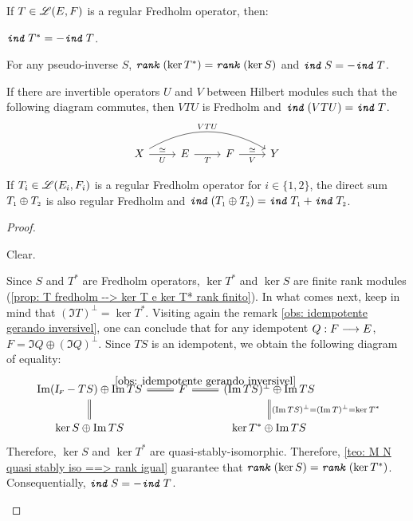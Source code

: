 \begin{proposicao}
\label{prop: propriedades de fredholm}
If $T\in \mathscr L(E,F)$ is a regular Fredholm operator, then:
\begin{itroman}
\item $\texttt{\textit{ind}}\, T^* = -\texttt{\textit{ind}}\, T$.
\item \label{prop item: propriedades de fredholm} For any pseudo-inverse $S$, $\texttt{\textit{rank}}\,(\ker T^*) = \texttt{\textit{rank}}\,(\ker S)$ and $\texttt{\textit{ind}}\, S = - \texttt{\textit{ind}}\, T$.
\item \label{prop item: invertivel tem ind = 0} If there are invertible operators $U$ and $V$ between Hilbert modules such that the following diagram commutes, then $VTU$ is Fredholm and $\texttt{\textit{ind}}\,(VTU) = \texttt{\textit{ind}}\, T$.
\begin{equation*}
\begin{tikzcd}
X \arrow[r, "U"', "\simeq"] \arrow[rrr, "VTU", bend left] & E \arrow[r, "T"'] & F \arrow[r, "V"', "\simeq"] & Y
\end{tikzcd}
\end{equation*}
\item \label{prop item: ind(T (+) F) = ind T + ind F} If $T_i\in \mathscr L(E_i,F_i)$ is a regular Fredholm operator for $i\in \{1,2\}$, the direct sum $\sub{T}{1}\oplus \sub{T}{2}$ is also regular Fredholm and $\ind(\sub{T}{1}\oplus \sub{T}{2}) = \ind \sub{T}{1}  + \ind \sub{T}{2}$.
\end{itroman}
\begin{proof}$\left.\right.$
\begin{itroman}
\item Clear.
\item Since $S$ and $T^*$ are Fredholm operators, $\ker T^*$ and $\ker S$ are finite rank modules (\ref{prop: T fredholm --> ker T e ker T* rank finito}). In what comes next, keep in mind that $(\Im T)^{\perp} = \ker T^*$. Visiting again the remark \ref{obs: idempotente gerando inversivel}, one can conclude that for any idempotent $Q : F \longrightarrow E$, $F = \Im Q \oplus (\Im Q)^{\perp}$. Since $TS$ is an idempotent, we obtain the following diagram of equality:
\begin{equation*}
\begin{tikzcd}
\Im(\sub\Id F-TS)\oplus \Im TS \arrow[d, equal] & F \arrow[l, equal] \arrow[r, equal, "\ref{obs: idempotente gerando inversivel}"] & (\Im TS)^{\perp} \oplus\Im TS \arrow[d, "(\Im TS)^{\perp} = (\Im T)^{\perp} = \ker T^*", equal] \\
\ker S \oplus \Im TS    &  & \ker T^* \oplus \Im TS                                                            
\end{tikzcd}
\end{equation*}
Therefore, $\ker S$ and $\ker T^*$ are quasi-stably-isomorphic. Therefore, \ref{teo: M N quasi stably iso ==> rank igual} guarantee that $\texttt{\textit{rank}}\,(\ker S) = \texttt{\textit{rank}}\,(\ker T^*)$. Consequentially, $\texttt{\textit{ind}}\, S = -\texttt{\textit{ind}}\, T$.


\end{itroman}
\end{proof}
\end{proposicao}

